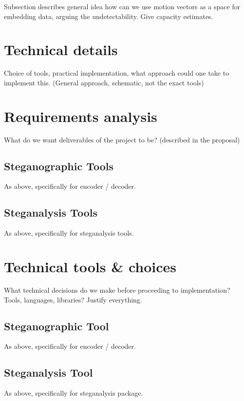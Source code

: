 \documentclass[12pt,british,twoside,notitlepage,usenames,dvipsnames,hypens,final]{report}
\numberwithin{equation}{section}
\numberwithin{figure}{section}
\begin{document}
Subsection describes general idea how can we use motion vectors as a space for embedding data, arguing the undetectability. Give capacity estimates.

\section{Technical details}

Choice of tools, practical implementation, what approach could one take to implement this. (General approach, schematic, not the exact tools)

\section{Requirements analysis}

What do we want deliverables of the project to be? (described in the proposal)

\subsection{Steganographic Tools}

As above, specifically for encoder / decoder.

\subsection{Steganalysis Tools}

As above, specifically for steganalysis tools.

\section{Technical tools \& choices}

What technical decisions do we make before proceeding to implementation? Tools, languages, libraries? Justify everything.

\subsection{Steganographic Tool}

As above, specifically for encoder / decoder.

\subsection{Steganalysis Tool}

As above, specifically for steganalysis package.
\end{document}
